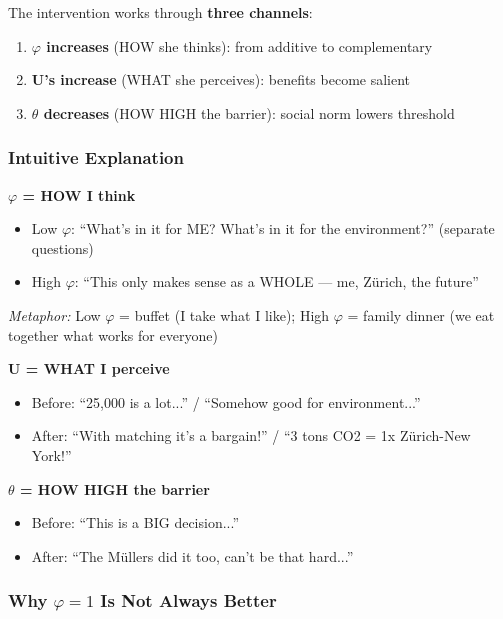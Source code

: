 The intervention works through \textbf{three channels}:
\begin{enumerate}
\item \textbf{$\varphi$ increases} (HOW she thinks): from additive to complementary
\item \textbf{U's increase} (WHAT she perceives): benefits become salient
\item \textbf{$\theta$ decreases} (HOW HIGH the barrier): social norm lowers threshold
\end{enumerate}

\subsubsection{Intuitive Explanation}

\begin{tcolorbox}[colback=blue!5!white,colframe=blue!75!black,title=The Three Levers --- Intuitive]
\textbf{$\varphi$ = HOW I think}
\begin{itemize}
\item Low $\varphi$: ``What's in it for ME? What's in it for the environment?'' (separate questions)
\item High $\varphi$: ``This only makes sense as a WHOLE --- me, Zürich, the future''
\end{itemize}
\textit{Metaphor:} Low $\varphi$ = buffet (I take what I like); High $\varphi$ = family dinner (we eat together what works for everyone)

\textbf{U = WHAT I perceive}
\begin{itemize}
\item Before: ``25,000 is a lot...'' / ``Somehow good for environment...''
\item After: ``With matching it's a bargain!'' / ``3 tons CO2 = 1x Zürich-New York!''
\end{itemize}

\textbf{$\theta$ = HOW HIGH the barrier}
\begin{itemize}
\item Before: ``This is a BIG decision...''
\item After: ``The Müllers did it too, can't be that hard...''
\end{itemize}
\end{tcolorbox}

\subsubsection{Why $\varphi = 1$ Is Not Always Better}

